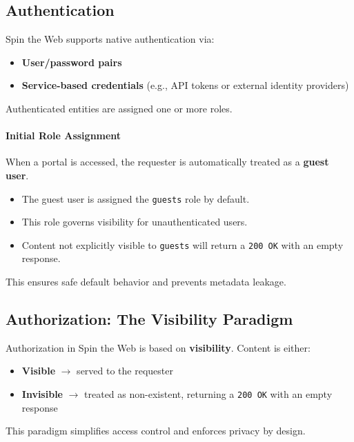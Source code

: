 \subsection{Authentication}

Spin the Web supports native authentication via:

\begin{itemize}
	\item \textbf{User/password pairs}
	\item \textbf{Service-based credentials} (e.g., API tokens or external identity providers)
\end{itemize}

Authenticated entities are assigned one or more roles.

\paragraph{Initial Role Assignment}
When a portal is accessed, the requester is automatically treated as a \textbf{guest user}.

\begin{itemize}
	\item The guest user is assigned the \texttt{guests} role by default.
	\item This role governs visibility for unauthenticated users.
	\item Content not explicitly visible to \texttt{guests} will return a \texttt{200 OK} with an empty response.
\end{itemize}

This ensures safe default behavior and prevents metadata leakage.

\subsection{Authorization: The Visibility Paradigm}

Authorization in Spin the Web is based on \textbf{visibility}. Content is either:

\begin{itemize}
	\item \textbf{Visible} $\to$ served to the requester
	\item \textbf{Invisible} $\to$ treated as non-existent, returning a \texttt{200 OK} with an empty response
\end{itemize}

This paradigm simplifies access control and enforces privacy by design.

